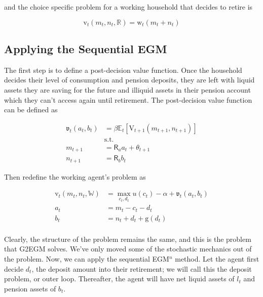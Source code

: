 \documentclass{article}
\newcommand{\DiscFac}{\beta}
\newcommand{\VFunc}{\mathrm{V}}
\newcommand{\util}{u}
\newcommand{\tShkEmp}{\theta}
\newcommand{\Ex}{\mathbb{E}}
\newcommand{\bRat}{b}
\newcommand{\cRat}{c}
\newcommand{\vFunc}{\mathrm{v}}
\newcommand{\Rfree}{\mathsf{R}}
\newcommand{\aRat}{a}
\newcommand{\mRat}{m}
\newcommand{\vEnd}{\mathfrak{v}}
\newcommand{\nRat}{n}
\newcommand{\dRat}{d}
\newcommand{\gFunc}{\mathrm{g}}
\newcommand{\lRat}{l}
\newcommand{\wFunc}{\mathrm{w}}
\newcommand{\Retire}{\mathbb{R}}
\newcommand{\Work}{\mathbb{W}}
\newcommand{\kapShare}{\alpha}
\begin{document}
and the choice specific problem for a working household that decides to retire
is

\begin{equation}
\vFunc_{t}(\mRat_{t}, \nRat_{t}, \Retire) =
    \wFunc_{t}(\mRat_{t}+\nRat_{t})
\end{equation}

\subsection{Applying the Sequential EGM}\label{Applying the Sequential EGM}

The first step is to define a post-decision value function. Once the household
decides their level of consumption and pension deposits, they are left with
liquid assets they are saving for the future and illiquid assets in their
pension account which they can't access again until retirement. The
post-decision value function can be defined as

\begin{equation}
\begin{split}
        \vEnd_{t}(\aRat_{t}, \bRat_{t}) & =  \DiscFac
        \Ex_{t} \left[ \VFunc_{t+1}(\mRat_{t+1}, \nRat_{t+1}) \right] \\
        & \text{s.t.} \\
        \mRat_{t+1} & = \Rfree_{\aRat} \aRat_{t} + \tShkEmp_{t+1} \\
        \nRat_{t+1} & = \Rfree_{\bRat} \bRat_{t}
    \end{split}
\end{equation}

Then redefine the working agent's problem as

\begin{equation}
\begin{split}
        \vFunc_{t}(\mRat_{t}, \nRat_{t}, \Work) & = \max_{\cRat_{t},
            \dRat_{t}} \util(\cRat_{t})  - \kapShare + \vEnd_{t}(\aRat_{t},
        \bRat_{t}) \\
        \aRat_{t} & = \mRat_{t} - \cRat_{t} - \dRat_{t} \\
        \bRat_{t} & = \nRat_{t} + \dRat_{t} + \gFunc(\dRat_{t}) \\
    \end{split}
\end{equation}

Clearly, the structure of the problem remains the same, and this is the problem
that G2EGM solves. We've only moved some
of the stochastic mechanics out of the problem. Now, we can apply the
sequential EGM$^n$ method. Let the agent first decide $\dRat_{t}$, the deposit
amount into their retirement; we will call this the deposit problem, or outer loop. Thereafter, the
agent will have net liquid assets
of $\lRat_{t}$ and pension assets of $\bRat_{t}$.
\end{document}

